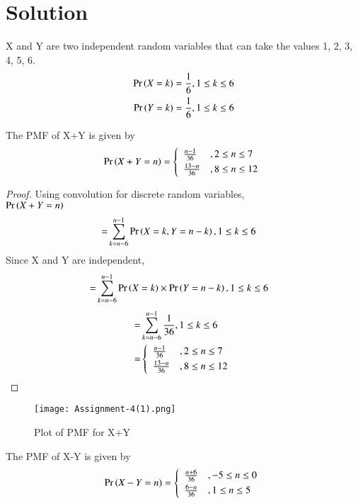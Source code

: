 \documentclass[journal,12pt,twocolumn]{IEEEtran}
\begin{document}
\section*{Solution}
X and Y are two independent random variables that can take the values 1, 2, 3, 4, 5, 6.
\begin{align}
    \Pr\left(X=k\right)=\frac{1}{6}, 1\leq k \leq 6\\
    \Pr\left(Y=k\right)=\frac{1}{6}, 1\leq k \leq 6
\end{align}
\begin{lemma}
The PMF of X+Y is given by\\
\begin{align}
\Pr\brak{X+Y=n}=
    \left\{
	        \begin{array}{ll}
		    \frac{n-1}{36}  & , 2 \leq n \leq 7 \smallskip\\
		    \frac{13-n}{36} & , 8 \leq n \leq 12
	        \end{array}
    \right.
\end{align}
\end{lemma}
\begin{proof}
Using convolution for discrete random variables,\\
$\Pr\left(X+Y=n\right)$
\begin{align}
    =&\sum_{k=n-6}^{n-1} \Pr\left(X=k,Y=n-k\right), 1\leq k \leq 6
    \end{align}
    Since X and Y are independent,
\begin{align}
    =&\sum_{k=n-6}^{n-1} \Pr\left(X=k\right)\times\Pr\left(Y=n-k\right), 1\leq k \leq 6
\end{align}
\begin{align}
    =&\sum_{k=n-6}^{n-1} \frac{1}{36}, 1\leq k \leq 6\\
    =&
    \left\{
	        \begin{array}{ll}
		    \frac{n-1}{36}  & , 2 \leq n \leq 7 \smallskip\\
		    \frac{13-n}{36} & , 8 \leq n \leq 12
	        \end{array}
    \right.\label{0.0.7}
\end{align}
\end{proof}
\begin{figure}[htb]
    \texttt{[image: Assignment-4(1).png]}
    \caption{Plot of PMF for X+Y}
\end{figure}
\begin{lemma}
The PMF of X-Y is given by\\
\begin{align}
    \Pr\brak{X-Y=n}
    =
    \left\{
	        \begin{array}{ll}
		    \frac{n+6}{36} & , -5 \leq n \leq 0 \smallskip\\
		    \frac{6-n}{36} & , 1  \leq n \leq 5
	        \end{array}
    \right.
\end{align}
\end{lemma}
\end{document}
